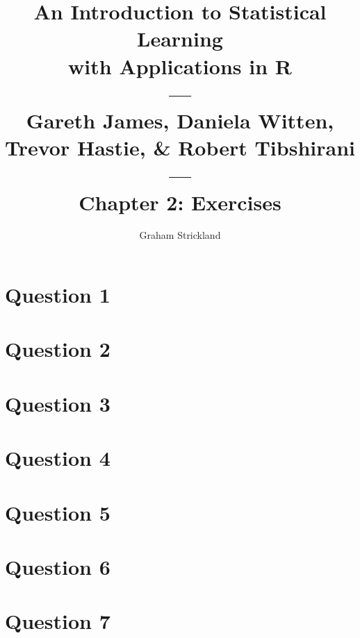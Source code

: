 \documentclass{article}
\title{
    An Introduction to Statistical Learning\\with Applications in R\\---\\
    Gareth James, Daniela Witten, Trevor Hastie, \& Robert Tibshirani\\---\\
    Chapter 2: Exercises
}
\author{Graham Strickland}
\begin{document}
\maketitle  

\section*{Question 1}


\section*{Question 2}


\section*{Question 3}


\section*{Question 4}


\section*{Question 5}


\section*{Question 6}


\section*{Question 7}

\end{document}
